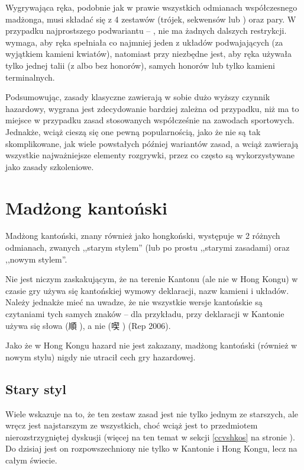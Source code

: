Wygrywająca ręka, podobnie jak w prawie wszystkich odmianach współczesnego
madżonga, musi składać się z 4 zestawów (trójek, sekwensów lub )
oraz pary. W przypadku najprostszego podwariantu --  , nie
ma żadnych dalszych restrykcji.  wymaga, aby ręka spełniała co
najmniej jeden z układów podwajających (za wyjątkiem kamieni kwiatów), natomiast
przy  niezbędne jest, aby ręka używała tylko jednej talii
(z albo bez honorów), samych honorów lub tylko kamieni terminalnych.

Podsumowując, zasady klasyczne zawierają w sobie dużo wyższy czynnik hazardowy,
wygrana jest zdecydowanie bardziej zależna od przypadku, niż ma to miejsce w
przypadku zasad stosowanych współcześnie na zawodach sportowych. Jednakże, wciąż
cieszą się one pewną popularnością, jako że nie są tak skomplikowane, jak wiele
powstałych później wariantów zasad, a wciąż zawierają wszystkie najważniejsze
elementy rozgrywki, przez co często są wykorzystywane jako zasady szkoleniowe.

\section{Madżong kantoński}
\label{hkos}
Madżong kantoński, znany również jako hongkoński, występuje w 2 różnych
odmianach, zwanych ,,starym stylem'' (lub po prostu ,,starymi zasadami) oraz
,,nowym stylem''.

Nie jest niczym zaskakującym, że na terenie Kantonu (ale nie w Hong Kongu) w
czasie gry używa się kantońskiej wymowy deklaracji, nazw kamieni i układów.
Należy jednakże mieć na uwadze, że nie wszystkie wersje kantońskie są czytaniami
tych samych znaków -- dla przykładu, przy deklaracji  w Kantonie
używa się słowa  (順 ), a nie  (喫
) (Rep 2006).

Jako że w Hong Kongu hazard nie jest zakazany, madżong kantoński (również w
nowym stylu) nigdy nie utracił cech gry hazardowej. %

\subsection{Stary styl}
Wiele wskazuje na to, że ten zestaw zasad jest nie tylko jednym ze starszych,
ale wręcz jest najstarszym ze wszystkich, choć wciąż jest to przedmiotem
nierozstrzygniętej dyskusji (więcej na ten temat w sekcji \ref{ccvshkos} na
stronie \pageref{ccvshkos}). Do dzisiaj jest on rozpowszechniony nie tylko w
Kantonie i Hong Kongu, lecz na całym świecie.

